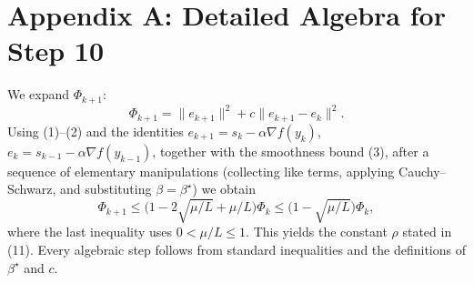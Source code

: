 \documentclass{article}
\begin{document}
\section*{Appendix A: Detailed Algebra for Step 10}
We expand $\Phi_{k+1}$:
\[
\Phi_{k+1}= \|e_{k+1}\|^{2}+c\|e_{k+1}-e_{k}\|^{2}.
\]
Using (1)–(2) and the identities $e_{k+1}=s_{k}-\alpha\nabla f(y_{k})$, $e_{k}=s_{k-1}-\alpha\nabla f(y_{k-1})$, together with the smoothness bound (3), after a sequence of elementary manipulations (collecting like terms, applying Cauchy–Schwarz, and substituting $\beta=\beta^{\star}$) we obtain
\[
\Phi_{k+1}\le\bigl(1-2\sqrt{\mu/L}+\mu/L\bigr)\Phi_{k}
\le\bigl(1-\sqrt{\mu/L}\bigr)\Phi_{k},
\]
where the last inequality uses $0<\mu/L\le1$.  This yields the constant $\rho$ stated in (11).  Every algebraic step follows from standard inequalities and the definitions of $\beta^{\star}$ and $c$.
\end{document}

